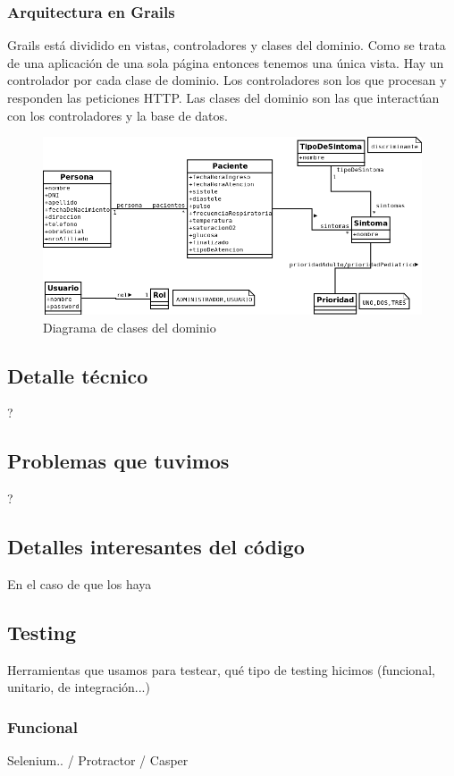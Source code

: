 \subsubsection{Arquitectura en Grails}
Grails está dividido en vistas, controladores y clases del dominio. Como se trata de una aplicación de una sola página entonces tenemos una única vista. Hay un controlador por cada clase de dominio. Los controladores son los que procesan y responden las peticiones HTTP. Las clases del dominio son las que interactúan con los controladores y la base de datos.
\begin{figure}[h]
\centering
\includegraphics[width=1.2\textwidth]{triage.png}
\caption{Diagrama de clases del dominio}
\end{figure}


\subsection{Detalle técnico}
?

\subsection{Problemas que tuvimos}
?

\subsection{Detalles interesantes del código}
En el caso de que los haya 




\subsection{Testing}
Herramientas que usamos para testear, qué tipo de testing hicimos (funcional, unitario, de integración...)
\subsubsection{Funcional}
Selenium.. / Protractor / Casper
